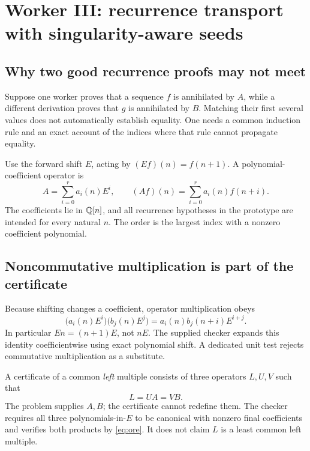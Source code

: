 \section{Worker III: recurrence transport with singularity-aware seeds}
\label{sec:recurrences}

\subsection{Why two good recurrence proofs may not meet}

Suppose one worker proves that a sequence $f$ is annihilated by $A$, while a
different derivation proves that $g$ is annihilated by $B$. Matching their first
several values does not automatically establish equality. One needs a common
induction rule and an exact account of the indices where that rule cannot
propagate equality.

Use the forward shift $E$, acting by $(Ef)(n)=f(n+1)$. A polynomial-coefficient
operator is
\[
A=\sum_{i=0}^{r}a_i(n)E^i,
\qquad (Af)(n)=\sum_{i=0}^{r}a_i(n)f(n+i).
\]
The coefficients lie in $\mathbb Q[n]$, and all recurrence hypotheses in the prototype
are intended for every natural $n$. The order is the largest index with a
nonzero coefficient polynomial.

\subsection{Noncommutative multiplication is part of the certificate}

Because shifting changes a coefficient, operator multiplication obeys
\begin{equation}\label{eq:ore}
\bigl(a_i(n)E^i\bigr)\bigl(b_j(n)E^j\bigr)
=a_i(n)b_j(n+i)E^{i+j}.
\end{equation}
In particular $En=(n+1)E$, not $nE$. The supplied checker expands this identity
coefficientwise using exact polynomial shift. A dedicated unit test rejects
commutative multiplication as a substitute.

A certificate of a common \emph{left} multiple consists of three operators
$L,U,V$ such that
\begin{equation}\label{eq:left-multiple}
L=UA=VB.
\end{equation}
The problem supplies $A,B$; the certificate cannot redefine them. The checker
requires all three polynomials-in-$E$ to be canonical with nonzero final
coefficients and verifies both products by \eqref{eq:ore}. It does not claim
$L$ is a least common left multiple.


